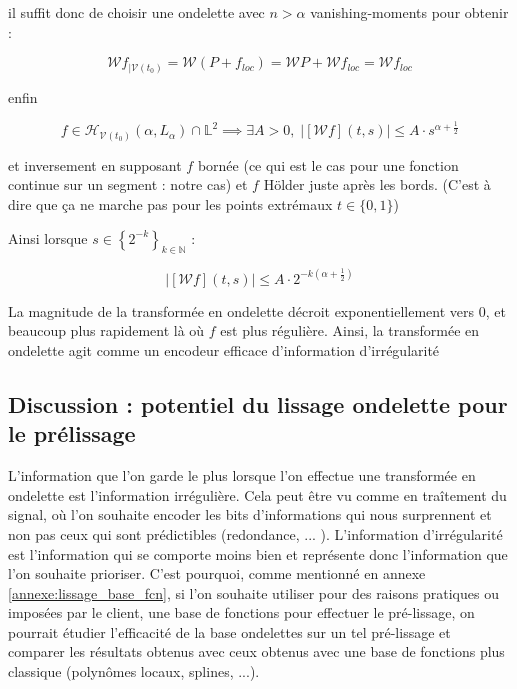 \begin{prop}

\end{prop}

il suffit donc de choisir une ondelette avec $n > \alpha$ vanishing-moments pour obtenir :

\begin{equation*}
	\mathcal W f_{| \mathcal V(t_0)} {=} \mathcal W ( P + f_{loc} ) = \mathcal W P + \mathcal W f_{loc} = \mathcal W f_{loc}
\end{equation*}

enfin
\begin{thm}


	\begin{equation*}
		f \in \mathcal H_{\mathcal V({t_0})}(\alpha, L_\alpha) \cap \mathds L^2 \implies \exists A>0, \; \left|\left[\mathcal Wf\right](t, s)\right| \leq A \cdot s^{\alpha  + \frac 1 2}
	\end{equation*}

	et inversement en supposant $f$ bornée (ce qui est le cas pour une fonction continue sur un segment : notre cas) et $f$ Hölder juste après les bords. (C'est à dire que ça ne marche pas pour les points extrémaux $t \in \{0, 1\}$)
\end{thm}

Ainsi lorsque $s \in \left\{ 2^{-k} \right\}_{k \in \mathds N}$ :

\begin{equation*}
	\left|\left[\mathcal Wf\right](t, s)\right| \leq A \cdot 2^{-k(\alpha  + \frac 1 2)}
\end{equation*}

La magnitude de la transformée en ondelette décroit exponentiellement vers 0, et beaucoup plus rapidement là où $f$ est plus régulière. Ainsi, la transformée en ondelette agit comme un encodeur efficace d'information d'irrégularité

\subsection{Discussion : potentiel du lissage ondelette pour le prélissage}

L'information que \og l'on garde le plus \fg lorsque l'on effectue une transformée en ondelette est l'information irrégulière. Cela peut être vu comme en traîtement du signal, où l'on souhaite encoder les bits d'informations qui \og nous surprennent \fg et non pas ceux qui sont prédictibles (redondance, ... ). L'information d'irrégularité est l'information qui se \og comporte moins bien \fg et représente donc l'information que l'on souhaite prioriser. C'est pourquoi, comme mentionné en annexe \ref{annexe:lissage_base_fcn}, si l'on souhaite utiliser pour des raisons pratiques ou imposées par le client, une base de fonctions pour effectuer le pré-lissage, on pourrait étudier l'efficacité de la base ondelettes sur un tel pré-lissage et comparer les résultats obtenus avec ceux obtenus avec une base de fonctions plus classique (polynômes locaux, splines, ...).